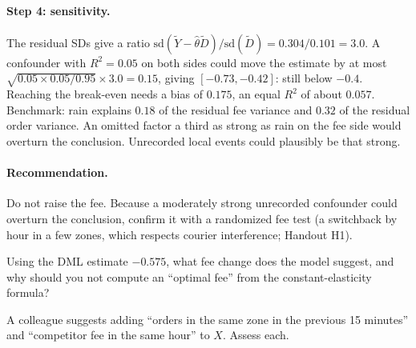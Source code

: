 \documentclass[11pt]{article}
\begin{document}
\paragraph{Step 4: sensitivity.} The residual SDs give a ratio $\text{sd}(\tilde Y - \hat\theta\tilde D)/\text{sd}(\tilde D) = 0.304/0.101 = 3.0$. A confounder with
$R^2 = 0.05$ on both sides could move the estimate by at most $\sqrt{0.05 \times 0.05/0.95} \times 3.0 = 0.15$, giving $[-0.73, -0.42]$: still below
$-0.4$. Reaching the break-even needs a bias of $0.175$, an equal $R^2$ of about $0.057$. Benchmark: rain explains $0.18$ of the residual fee
variance and $0.32$ of the residual order variance. An omitted factor a third as strong as rain on the fee side would overturn the
conclusion. Unrecorded local events could plausibly be that strong.

\paragraph{Recommendation.} Do not raise the fee. Because a moderately strong unrecorded confounder could overturn the conclusion,
confirm it with a randomized fee test (a switchback by hour in a few zones, which respects courier interference; Handout H1).

\begin{exercise}[computation]
Using the DML estimate $-0.575$, what fee change does the model suggest, and why should you not compute an ``optimal fee'' from the constant-elasticity formula?
\end{exercise}

\begin{exercise}[judgment]
A colleague suggests adding ``orders in the same zone in the previous 15 minutes'' and ``competitor fee in the same hour'' to $X$. Assess
each.
\end{exercise}
\end{document}
